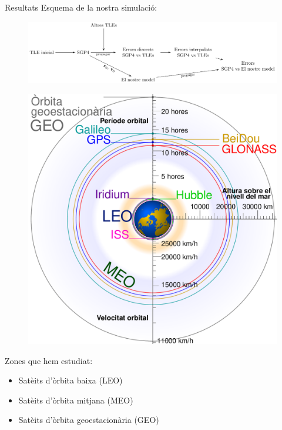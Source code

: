 \documentclass{beamer} %
\begin{document}
\begin{frame}{Resultats}
  Esquema de la nostra simulació:
  \begin{figure}
    \centering
    \includegraphics[width=\textwidth]{../Images/simulation_scheme_ca.pdf}
  \end{figure}\pause
  \begin{minipage}{0.4\textwidth}
    \begin{figure}[ht]
      \centering
      \includegraphics[width=\textwidth]{../Images/satellite_orbits_custom_ca.pdf}
    \end{figure}
  \end{minipage}\hfill
  \begin{minipage}{0.55\textwidth}
    Zones que hem estudiat:
    \begin{itemize}
      \item Satè\lgem its d'òrbita baixa (LEO)
      \item Satè\lgem its d'òrbita mitjana (MEO)
      \item Satè\lgem its d'òrbita geoestacionària (GEO)
    \end{itemize}
  \end{minipage}
\end{frame}
\end{document}
